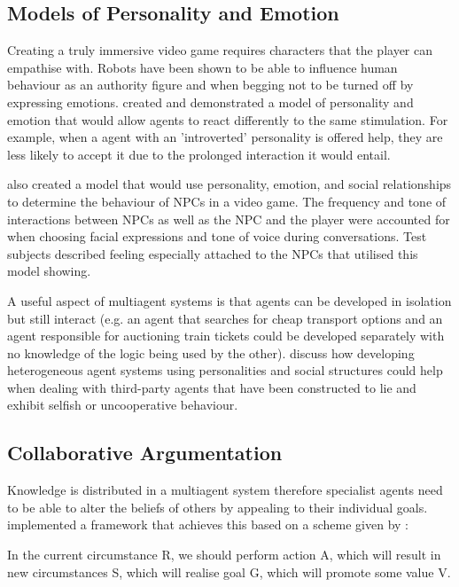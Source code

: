 \documentclass[conference]{IEEEtran}
\begin{document}
\subsection{Models of Personality and Emotion}

Creating a truly immersive video game requires characters that the player can empathise with. Robots have been shown to be able to influence human behaviour as an authority figure \cite{bossrobot} and when begging not to be turned off \cite{turnoffrobot} by expressing emotions. \cite{personalitymodel} created and demonstrated a model of personality and emotion that would allow agents to react differently to the same stimulation. For example, when a agent with an 'introverted' personality is offered help, they are less likely to accept it due to the prolonged interaction it would entail. 

	\cite{skyrim} also created a model that would use personality, emotion, and social relationships to determine the behaviour of NPCs in a video game. The frequency and tone of interactions between NPCs as well as the NPC and the player were accounted for when choosing facial expressions and tone of voice during conversations. Test subjects described feeling especially attached to the NPCs that utilised this model showing.

A useful aspect of multiagent systems is that agents can be developed in isolation but still interact (e.g. an agent that searches for cheap transport options and an agent responsible for auctioning train tickets could be developed separately with no knowledge of the logic being used by the other). \cite{hetrogenousagents} discuss how developing heterogeneous agent systems using personalities and social structures could help when dealing with third-party agents that have been constructed to lie and exhibit selfish or uncooperative behaviour.

\subsection{Collaborative Argumentation}

Knowledge is distributed in a multiagent system therefore specialist agents need to be able to alter the beliefs of others by appealing to their individual goals. \cite{argumentation} implemented a framework that achieves this based on a scheme given by \cite{reasoning}:

\begin{displayquote}
	In the current circumstance R, we should perform action A, which will result in new circumstances S, which will realise goal G, which will promote some value V.
\end{displayquote}
\end{document}
